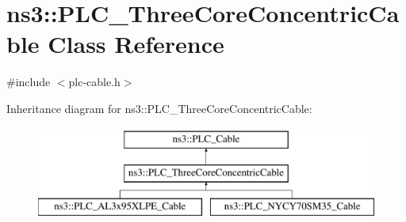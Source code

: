 \hypertarget{classns3_1_1PLC__ThreeCoreConcentricCable}{\section{ns3\-:\-:\-P\-L\-C\-\_\-\-Three\-Core\-Concentric\-Cable \-Class \-Reference}
\label{classns3_1_1PLC__ThreeCoreConcentricCable}
}


{\ttfamily \#include $<$plc-\/cable.\-h$>$}

\-Inheritance diagram for ns3\-:\-:\-P\-L\-C\-\_\-\-Three\-Core\-Concentric\-Cable\-:\begin{figure}[H]
\begin{center}
\leavevmode
\includegraphics[height=3.000000cm]{classns3_1_1PLC__ThreeCoreConcentricCable}
\end{center}
\end{figure}
